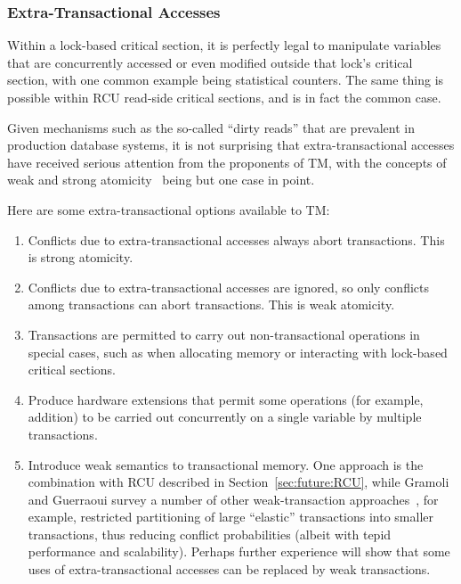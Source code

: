 \subsubsection{Extra-Transactional Accesses}
\label{sec:future:Extra-Transactional Accesses}

Within a lock-based critical section, it is perfectly legal to manipulate
variables that are concurrently accessed or even modified outside that
lock's critical section, with one common example being statistical
counters.
The same thing is possible within RCU read-side critical
sections, and is in fact the common case.

Given mechanisms such as the so-called ``dirty reads'' that are
prevalent in production database systems, it is not surprising
that extra-transactional accesses have received serious attention
from the proponents of TM, with the concepts of weak and strong
atomicity~\cite{Blundell2006TMdeadlock} being but one case in point.

Here are some extra-transactional options available to TM:

\begin{enumerate}
\item	Conflicts due to extra-transactional accesses always abort
	transactions.
	This is strong atomicity.
\item	Conflicts due to extra-transactional accesses are ignored,
	so only conflicts among transactions can abort transactions.
	This is weak atomicity.
\item	Transactions are permitted to carry out non-transactional
	operations in special cases, such as when allocating memory or
	interacting with lock-based critical sections.
\item	Produce hardware extensions that permit some operations
	(for example, addition) to be carried out concurrently on a
	single variable by multiple transactions.
\item	Introduce weak semantics to transactional memory.
	One approach is the combination with RCU described in
	Section~\ref{sec:future:RCU}, while Gramoli and Guerraoui
	survey a number of other weak-transaction
	approaches~\cite{Gramoli:2014:DTP:2541883.2541900}, for example,
	restricted partitioning of large
	``elastic'' transactions into smaller transactions, thus
	reducing conflict probabilities (albeit with tepid performance
	and scalability).
	Perhaps further experience will show that some uses of
	extra-transactional accesses can be replaced by weak
	transactions.
\end{enumerate}

